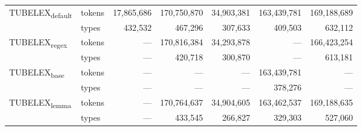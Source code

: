 \begin{tabular}{llrrrrr}
\multirow[c]{2}{*}{TUBELEX\textsubscript{default}} & tokens & 17,865,686 & 170,750,870 & 34,903,381 & 163,439,781 & 169,188,689 \\
 & \cellcolor[HTML]{EEEEEE} types & \cellcolor[HTML]{EEEEEE} 432,532 & \cellcolor[HTML]{EEEEEE} 467,296 & \cellcolor[HTML]{EEEEEE} 307,633 & \cellcolor[HTML]{EEEEEE} 409,503 & \cellcolor[HTML]{EEEEEE} 632,112 \\
\multirow[c]{2}{*}{TUBELEX\textsubscript{regex}} & tokens & {---} & 170,816,384 & 34,293,878 & {---} & 166,423,254 \\
 & \cellcolor[HTML]{EEEEEE} types & \cellcolor[HTML]{EEEEEE} {---} & \cellcolor[HTML]{EEEEEE} 420,718 & \cellcolor[HTML]{EEEEEE} 300,870 & \cellcolor[HTML]{EEEEEE} {---} & \cellcolor[HTML]{EEEEEE} 613,181 \\
\multirow[c]{2}{*}{TUBELEX\textsubscript{base}} & tokens & {---} & {---} & {---} & 163,439,781 & {---} \\
 & \cellcolor[HTML]{EEEEEE} types & \cellcolor[HTML]{EEEEEE} {---} & \cellcolor[HTML]{EEEEEE} {---} & \cellcolor[HTML]{EEEEEE} {---} & \cellcolor[HTML]{EEEEEE} 378,276 & \cellcolor[HTML]{EEEEEE} {---} \\
\multirow[c]{2}{*}{TUBELEX\textsubscript{lemma}} & tokens & {---} & 170,764,637 & 34,904,605 & 163,462,537 & 169,188,635 \\
 & \cellcolor[HTML]{EEEEEE} types & \cellcolor[HTML]{EEEEEE} {---} & \cellcolor[HTML]{EEEEEE} 433,545 & \cellcolor[HTML]{EEEEEE} 266,827 & \cellcolor[HTML]{EEEEEE} 329,303 & \cellcolor[HTML]{EEEEEE} 527,060 \\
\bottomrule
\end{tabular}
